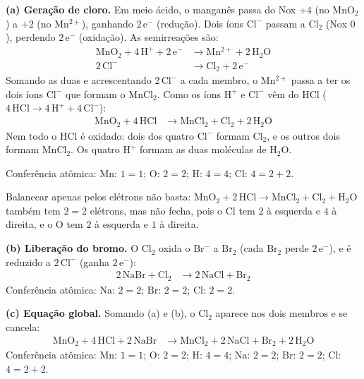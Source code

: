 \documentclass{article}%
\begin{document}
\textbf{(a) Geração de cloro.} Em meio ácido, o manganês passa do Nox $+4$ (no $\mathrm{MnO_2}$) a $+2$ (no $\mathrm{Mn^{2+}}$), ganhando $2\,\mathrm{e^{-}}$ (redução). Dois íons $\mathrm{Cl^{-}}$ passam a $\mathrm{Cl_2}$ (Nox $0$), perdendo $2\,\mathrm{e^{-}}$ (oxidação). As semirreações são:
\begin{align*}
\mathrm{MnO_2 + 4\,H^{+} + 2\,e^{-}} &\longrightarrow \mathrm{Mn^{2+} + 2\,H_2O} \\
\mathrm{2\,Cl^{-}} &\longrightarrow \mathrm{Cl_2 + 2\,e^{-}}
\end{align*}
Somando as duas e acrescentando $2\,\mathrm{Cl^{-}}$ a cada membro, o $\mathrm{Mn^{2+}}$ passa a ter os dois íons $\mathrm{Cl^{-}}$ que formam o $\mathrm{MnCl_2}$. Como os íons $\mathrm{H^{+}}$ e $\mathrm{Cl^{-}}$ vêm do $\mathrm{HCl}$ ($4\,\mathrm{HCl} \to 4\,\mathrm{H^{+}} + 4\,\mathrm{Cl^{-}}$):
\begin{align*}
\mathrm{MnO_2 + 4\,HCl} &\longrightarrow \mathrm{MnCl_2 + Cl_2 + 2\,H_2O}
\end{align*}
Nem todo o $\mathrm{HCl}$ é oxidado: dois dos quatro $\mathrm{Cl^{-}}$ formam $\mathrm{Cl_2}$, e os outros dois formam $\mathrm{MnCl_2}$. Os quatro $\mathrm{H^{+}}$ formam as duas moléculas de $\mathrm{H_2O}$.

Conferência atômica: $\mathrm{Mn}$: $1 = 1$; $\mathrm{O}$: $2 = 2$; $\mathrm{H}$: $4 = 4$; $\mathrm{Cl}$: $4 = 2 + 2$.

Balancear apenas pelos elétrons não basta: $\mathrm{MnO_2 + 2\,HCl \longrightarrow MnCl_2 + Cl_2 + H_2O}$ também tem $2 = 2$ elétrons, mas não fecha, pois o $\mathrm{Cl}$ tem $2$ à esquerda e $4$ à direita, e o $\mathrm{O}$ tem $2$ à esquerda e $1$ à direita.

\textbf{(b) Liberação do bromo.} O $\mathrm{Cl_2}$ oxida o $\mathrm{Br^{-}}$ a $\mathrm{Br_2}$ (cada $\mathrm{Br_2}$ perde $2\,\mathrm{e^{-}}$), e é reduzido a $2\,\mathrm{Cl^{-}}$ (ganha $2\,\mathrm{e^{-}}$):
\begin{align*}
\mathrm{2\,NaBr + Cl_2} &\longrightarrow \mathrm{2\,NaCl + Br_2}
\end{align*}
Conferência atômica: $\mathrm{Na}$: $2 = 2$; $\mathrm{Br}$: $2 = 2$; $\mathrm{Cl}$: $2 = 2$.

\textbf{(c) Equação global.} Somando (a) e (b), o $\mathrm{Cl_2}$ aparece nos dois membros e se cancela:
\begin{align*}
\mathrm{MnO_2 + 4\,HCl + 2\,NaBr} &\longrightarrow \mathrm{MnCl_2 + 2\,NaCl + Br_2 + 2\,H_2O}
\end{align*}
Conferência atômica: $\mathrm{Mn}$: $1 = 1$; $\mathrm{O}$: $2 = 2$; $\mathrm{H}$: $4 = 4$; $\mathrm{Na}$: $2 = 2$; $\mathrm{Br}$: $2 = 2$; $\mathrm{Cl}$: $4 = 2 + 2$.
\end{document}
